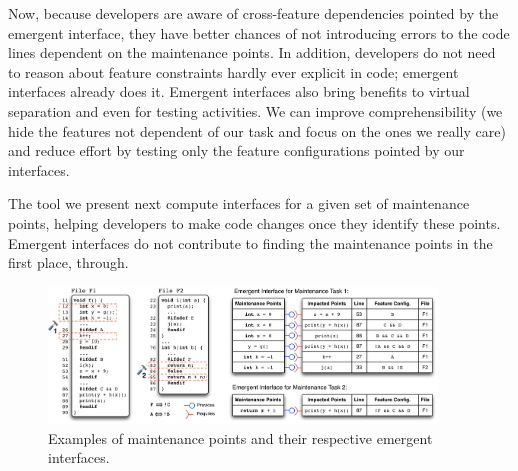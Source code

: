 Now, because developers are aware of cross-feature dependencies pointed by the emergent interface, they have better chances of not introducing errors to the code lines dependent on the maintenance points. In addition, developers do not need to reason about feature constraints hardly ever explicit in code; emergent interfaces already does it. Emergent interfaces also bring benefits to virtual separation and even for testing activities. We can improve comprehensibility (we hide the features not dependent of our task and focus on the ones we really care) and reduce effort by testing only the feature configurations pointed by our interfaces.

The tool we present next compute interfaces for a given set of maintenance points, helping developers to make code changes once they identify these points. Emergent interfaces do not contribute to finding the maintenance points in the first place, through.



\begin{figure}[ht]
\centering
\includegraphics[width=0.92\textwidth]{images/EIs.pdf}
\caption{Examples of maintenance points and their respective emergent interfaces.}
\label{fig:eis}
\end{figure}



